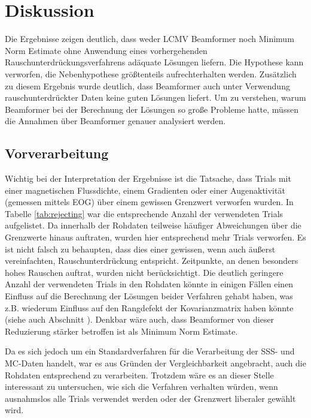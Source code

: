 \documentclass[doc,a4paper,12pt]{apa6}
\makeatletter
\DeclareRobustCommand*{\nameref}[1]{%
      \glqq{\myorg@nameref{#1}}\grqq%
    }%
\makeatother
\begin{document}
\section{Diskussion}
\label{sec:diskussion}

Die Ergebnisse zeigen deutlich, dass weder LCMV Beamformer noch Minimum Norm Estimate ohne Anwendung eines vorhergehenden Rauschunterdrückungsverfahrens adäquate Lösungen liefern. Die Hypothese kann verworfen, die Nebenhypothese größtenteils aufrechterhalten werden. Zusätzlich zu diesem Ergebnis wurde deutlich, dass Beamformer auch unter Verwendung rauschunterdrückter Daten keine guten Lösungen liefert. Um zu verstehen, warum Beamformer bei der Berechnung der Lösungen so große Probleme hatte, müssen die Annahmen über Beamformer genauer analysiert werden.

\subsection{Vorverarbeitung}

Wichtig bei der Interpretation der Ergebnisse ist die Tatsache, dass Trials mit einer magnetischen Flussdichte, einem Gradienten oder einer Augenaktivität (gemessen mittels EOG) über einem gewissen Grenzwert verworfen wurden. In Tabelle \ref{tab:rejecting} war die entsprechende Anzahl der verwendeten Trials aufgelistet. Da innerhalb der Rohdaten teilweise häufiger Abweichungen über die Grenzwerte hinaus auftraten, wurden hier entsprechend mehr Trials verworfen. Es ist nicht falsch zu behaupten, dass dies einer gewissen, wenn auch äußerst vereinfachten, Rauschunterdrückung entspricht. Zeitpunkte, an denen besonders hohes Rauschen auftrat, wurden nicht berücksichtigt. Die deutlich geringere Anzahl der verwendeten Trials in den Rohdaten könnte in einigen Fällen einen Einfluss auf die Berechnung der Lösungen beider Verfahren gehabt haben, was z.B. wiederum Einfluss auf den Rangdefekt der Kovarianzmatrix haben könnte (siehe auch Abschnitt \nameref{sec:regu-kov}). Denkbar wäre auch, dass Beamformer von dieser Reduzierung stärker betroffen ist als Minimum Norm Estimate.

Da es sich jedoch um ein Standardverfahren für die Verarbeitung der SSS- und MC-Daten handelt, war es aus Gründen der Vergleichbarkeit angebracht, auch die Rohdaten entsprechend zu verarbeiten. Trotzdem wäre es an dieser Stelle interessant zu untersuchen, wie sich die Verfahren verhalten würden, wenn ausnahmslos alle Trials verwendet werden oder der Grenzwert liberaler gewählt wird.
\end{document}
